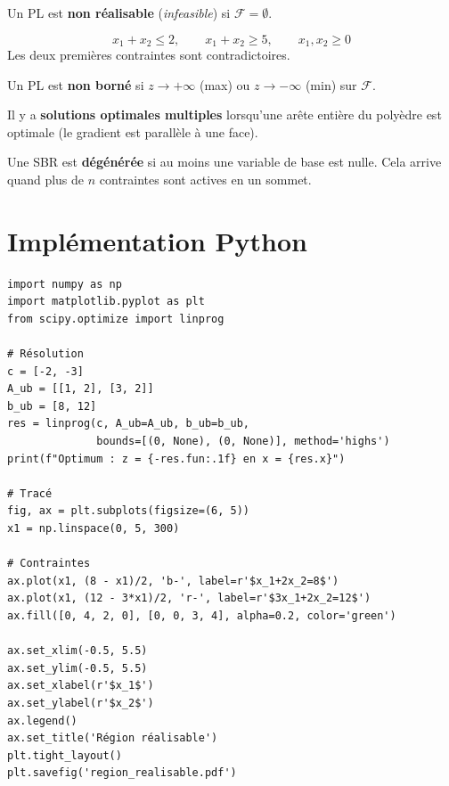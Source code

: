 \begin{definition}
Un PL est \textbf{non r\'ealisable} (\textit{infeasible}) si $\mathcal{F}
= \emptyset$.
\end{definition}

\begin{exemple}
\[
  x_1 + x_2 \le 2, \qquad x_1 + x_2 \ge 5, \qquad x_1, x_2 \ge 0
\]
Les deux premi\`eres contraintes sont contradictoires.
\end{exemple}

\begin{definition}
Un PL est \textbf{non born\'e} si $z \to +\infty$ (max) ou $z \to -\infty$
(min) sur $\mathcal{F}$.
\end{definition}

\begin{definition}
Il y a \textbf{solutions optimales multiples} lorsqu'une ar\^ete enti\`ere du
poly\`edre est optimale (le gradient est parall\`ele \`a une face).
\end{definition}

\begin{definition}[D\'eg\'en\'erescence]
Une SBR est \textbf{d\'eg\'en\'er\'ee} si au moins une variable de base est nulle.
Cela arrive quand plus de $n$ contraintes sont actives en un sommet.
\end{definition}

\section{Impl\'ementation Python}

\begin{codeblock}[title=\textbf{Visualisation de la r\'egion r\'ealisable}]
\begin{verbatim}
import numpy as np
import matplotlib.pyplot as plt
from scipy.optimize import linprog

# Résolution
c = [-2, -3]
A_ub = [[1, 2], [3, 2]]
b_ub = [8, 12]
res = linprog(c, A_ub=A_ub, b_ub=b_ub,
              bounds=[(0, None), (0, None)], method='highs')
print(f"Optimum : z = {-res.fun:.1f} en x = {res.x}")

# Tracé
fig, ax = plt.subplots(figsize=(6, 5))
x1 = np.linspace(0, 5, 300)

# Contraintes
ax.plot(x1, (8 - x1)/2, 'b-', label=r'$x_1+2x_2=8$')
ax.plot(x1, (12 - 3*x1)/2, 'r-', label=r'$3x_1+2x_2=12$')
ax.fill([0, 4, 2, 0], [0, 0, 3, 4], alpha=0.2, color='green')

ax.set_xlim(-0.5, 5.5)
ax.set_ylim(-0.5, 5.5)
ax.set_xlabel(r'$x_1$')
ax.set_ylabel(r'$x_2$')
ax.legend()
ax.set_title('Région réalisable')
plt.tight_layout()
plt.savefig('region_realisable.pdf')
\end{verbatim}
\end{codeblock}

